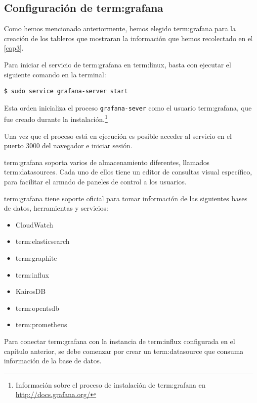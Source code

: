 \subsection{Configuración de \gls{term:grafana}}
\label{configuracion-de-grafana}

Como hemos mencionado anteriormente, hemos elegido \gls{term:grafana} para la
creación de los tableros que mostraran la información que hemos recolectado en
el \autoref{cap3}.

Para iniciar el servicio de \gls{term:grafana} en \gls{term:linux}, basta con
ejecutar el siguiente comando en la terminal:

\begin{lstlisting}
$ sudo service grafana-server start
\end{lstlisting}

Esta orden inicializa el proceso \texttt{grafana-sever} como el usuario
\gls{term:grafana}, que fue creado durante la instalación.\footnote{
Información sobre el proceso de instalación de \gls{term:grafana} en
\url{http://docs.grafana.org/}}

Una vez que el proceso está en ejecución es posible acceder al servicio en el
puerto 3000 del navegador e iniciar sesión.


\gls{term:grafana} soporta varios  de almacenamiento diferentes,
llamados \glspl{term:datasource}. Cada uno de ellos tiene un editor de consultas
visual específico, para facilitar el armado de paneles de control a los
usuarios.

\gls{term:grafana} tiene soporte oficial para tomar información de las
siguientes bases de datos, herramientas y servicios:

\begin{itemize}
  \item CloudWatch
  \item \gls{term:elasticsearch}
  \item \gls{term:graphite}
  \item \gls{term:influx}
  \item KairosDB
  \item \gls{term:opentsdb}
  \item \gls{term:prometheus}
\end{itemize}

Para conectar \gls{term:grafana} con la instancia de \gls{term:influx}
configurada en el capítulo anterior, se debe comenzar por crear un \gls{term:datasource}
que consuma información de la base de datos.

